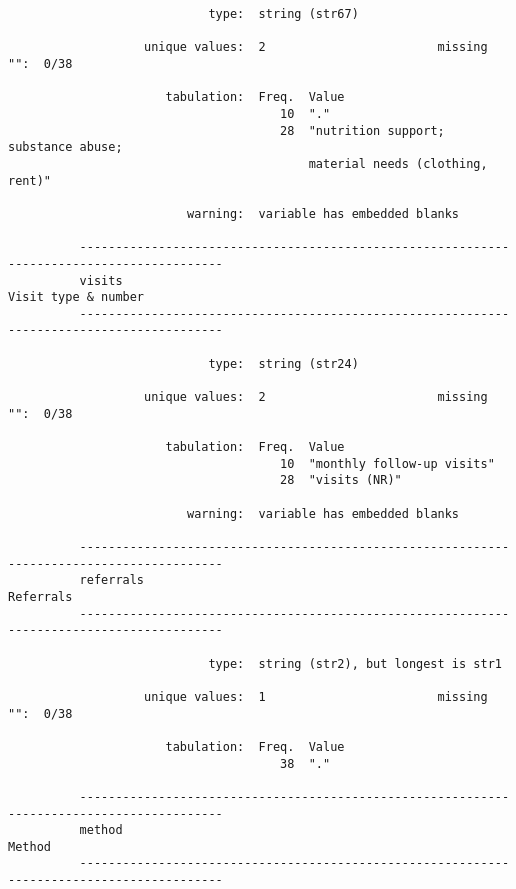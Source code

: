 \documentclass{article}
\begin{document}
\begin{verbatim}
                            type:  string (str67)
          
                   unique values:  2                        missing "":  0/38
          
                      tabulation:  Freq.  Value
                                      10  "."
                                      28  "nutrition support; substance abuse;
                                          material needs (clothing, rent)"
          
                         warning:  variable has embedded blanks
          
          ------------------------------------------------------------------------------------------
          visits                                                                 Visit type & number
          ------------------------------------------------------------------------------------------
          
                            type:  string (str24)
          
                   unique values:  2                        missing "":  0/38
          
                      tabulation:  Freq.  Value
                                      10  "monthly follow-up visits"
                                      28  "visits (NR)"
          
                         warning:  variable has embedded blanks
          
          ------------------------------------------------------------------------------------------
          referrals                                                                        Referrals
          ------------------------------------------------------------------------------------------
          
                            type:  string (str2), but longest is str1
          
                   unique values:  1                        missing "":  0/38
          
                      tabulation:  Freq.  Value
                                      38  "."
          
          ------------------------------------------------------------------------------------------
          method                                                                              Method
          ------------------------------------------------------------------------------------------
          

\end{verbatim}
\end{document}
